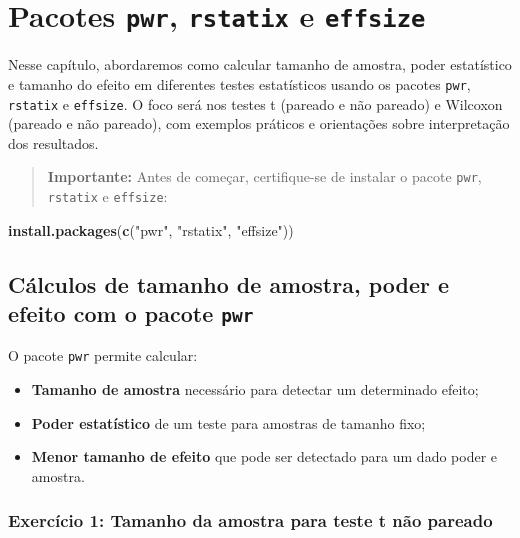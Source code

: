 \documentclass[
]{book}
\newenvironment{Shaded}{\begin{snugshade}}{\end{snugshade}}
\newcommand{\FunctionTok}[1]{\textcolor[rgb]{0.13,0.29,0.53}{\textbf{#1}}}
\newcommand{\NormalTok}[1]{#1}
\newcommand{\StringTok}[1]{\textcolor[rgb]{0.31,0.60,0.02}{#1}}
\providecommand{\tightlist}{%
  \setlength{\itemsep}{0pt}\setlength{\parskip}{0pt}}
\begin{document}
\chapter{\texorpdfstring{Pacotes \texttt{pwr}, \texttt{rstatix} e \texttt{effsize}}{Pacotes pwr, rstatix e effsize}}\label{pacotes-pwr-rstatix-e-effsize}

Nesse capítulo, abordaremos como calcular tamanho de amostra, poder estatístico e tamanho do efeito em diferentes testes estatísticos usando os pacotes \texttt{pwr}, \texttt{rstatix} e \texttt{effsize}. O foco será nos testes t (pareado e não pareado) e Wilcoxon (pareado e não pareado), com exemplos práticos e orientações sobre interpretação dos resultados.

\begin{quote}
\textbf{Importante:} Antes de começar, certifique-se de instalar o pacote \texttt{pwr}, \texttt{rstatix} e \texttt{effsize}:
\end{quote}

\begin{Shaded}
\begin{Highlighting}[]
\FunctionTok{install.packages}\NormalTok{(}\FunctionTok{c}\NormalTok{(}\StringTok{"pwr"}\NormalTok{, }\StringTok{"rstatix"}\NormalTok{, }\StringTok{"effsize"}\NormalTok{))}
\end{Highlighting}
\end{Shaded}

\section{\texorpdfstring{Cálculos de tamanho de amostra, poder e efeito com o pacote \texttt{pwr}}{Cálculos de tamanho de amostra, poder e efeito com o pacote pwr}}\label{cuxe1lculos-de-tamanho-de-amostra-poder-e-efeito-com-o-pacote-pwr}

O pacote \texttt{pwr} permite calcular:

\begin{itemize}
\tightlist
\item
  \textbf{Tamanho de amostra} necessário para detectar um determinado efeito;
\item
  \textbf{Poder estatístico} de um teste para amostras de tamanho fixo;
\item
  \textbf{Menor tamanho de efeito} que pode ser detectado para um dado poder e amostra.
\end{itemize}

\subsection{Exercício 1: Tamanho da amostra para teste t não pareado}\label{exercuxedcio-1-tamanho-da-amostra-para-teste-t-nuxe3o-pareado}
\end{document}
